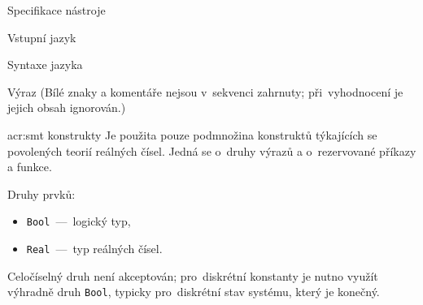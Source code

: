 \documentclass[thesis=M,czech]{FITthesis}[2012/06/26]
\newcommand{\acrlabel}[1]{acr:#1}
\newcommand{\acr}[1]{\acrshort{\acrlabel{#1}}}
\newcommand{\id}[1]{\texttt{#1}}
\begin{document}
\begin{section}{Specifikace nástroje}
\begin{subsection}{Vstupní jazyk}
\begin{subsubsection}{Syntaxe jazyka}
\begin{paragraph}{Výraz}
(Bílé znaky a komentáře nejsou v~sekvenci zahrnuty;
při~vyhodnocení je jejich obsah ignorován.)
\end{paragraph} %


\end{subsubsection} %


\begin{subsubsection}{\acr{smt} konstrukty}\label{sss:design:spec:ilang:smt}
Je použita pouze podmnožina konstruktů
týkajících se povolených teorií reálných čísel.
Jedná se o~druhy výrazů
a o~rezervované příkazy a funkce.


\begin{paragraph}{Druhy prvků:}\label{p:design:spec:ilang:smt:sorts}
\begin{itemize}
\item \id{Bool}~---~logický typ,
\item \id{Real}~---~typ reálných čísel.
\end{itemize}
Celočíselný druh není akceptován;
pro~diskrétní konstanty je nutno využít výhradně druh \id{Bool},
typicky pro~diskrétní stav systému, který je konečný.
\end{paragraph} %



\end{subsubsection}
\end{subsection}
\end{section}
\end{document}
